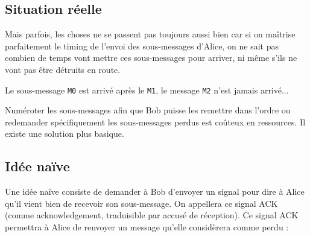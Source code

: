 \documentclass[a4paper,dvipsnames]{article}
\begin{document}
\subsection{Situation réelle}

Mais parfois, les choses ne se passent pas toujours aussi bien car si on maîtrise parfaitement le timing de l'envoi des sous-messages d'Alice, on ne sait pas combien de temps vont mettre ces sous-messages pour arriver, ni même s'ils ne vont pas être détruits en route.

\begin{center}
\end{center}

Le sous-message \texttt{M0} est arrivé après le \texttt{M1}, le message \texttt{M2} n'est jamais arrivé...

Numéroter les sous-messages afin que Bob puisse les remettre dans l'ordre ou redemander spécifiquement les sous-messages perdus est coûteux en ressources. Il existe une solution plus basique.

\subsection{Idée naïve}

Une idée naïve consiste de demander à Bob d'envoyer un signal pour dire à Alice qu'il vient bien de recevoir son sous-message. On appellera ce signal ACK (comme acknowledgement, traduisible par \og{}accusé de réception\fg{}). Ce signal ACK permettra à Alice de renvoyer un message qu'elle considèrera comme perdu :
\end{document}
